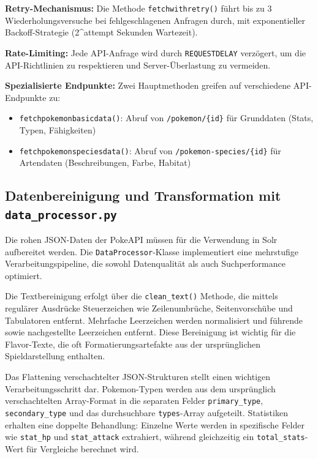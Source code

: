 \textbf{Retry-Mechanismus:} Die Methode \texttt{fetch\textunderscore with\textunderscore retry()} führt bis zu 3 Wiederholungsversuche bei fehlgeschlagenen Anfragen durch, mit exponentieller Backoff-Strategie (2\textasciicircum attempt Sekunden Wartezeit).

\textbf{Rate-Limiting:} Jede API-Anfrage wird durch \texttt{REQUEST\textunderscore DELAY} verzögert, um die API-Richtlinien zu respektieren und Server-Überlastung zu vermeiden.

\textbf{Spezialisierte Endpunkte:} Zwei Hauptmethoden greifen auf verschiedene API-Endpunkte zu:
\begin{itemize}
    \item \texttt{fetch\textunderscore pokemon\textunderscore basic\textunderscore data()}: Abruf von \texttt{/pokemon/\{id\}} für Grunddaten (Stats, Typen, Fähigkeiten)
    \item \texttt{fetch\textunderscore pokemon\textunderscore species\textunderscore data()}: Abruf von \texttt{/pokemon-species/\{id\}} für Artendaten (Beschreibungen, Farbe, Habitat)
\end{itemize}

\subsection{Datenbereinigung und Transformation mit \texttt{data\_processor.py}}

Die rohen JSON-Daten der PokeAPI müssen für die Verwendung in Solr aufbereitet werden. Die \texttt{DataProcessor}-Klasse implementiert eine mehrstufige Verarbeitungspipeline, die sowohl Datenqualität als auch Suchperformance optimiert.

Die Textbereinigung erfolgt über die \texttt{clean\_text()} Methode, die mittels regulärer Ausdrücke Steuerzeichen wie Zeilenumbrüche, Seitenvorschübe und Tabulatoren entfernt. Mehrfache Leerzeichen werden normalisiert und führende sowie nachgestellte Leerzeichen entfernt. Diese Bereinigung ist wichtig für die Flavor-Texte, die oft Formatierungsartefakte aus der ursprünglichen Spieldarstellung enthalten.

Das Flattening verschachtelter JSON-Strukturen stellt einen wichtigen Verarbeitungsschritt dar. Pokemon-Typen werden aus dem ursprünglich verschachtelten Array-Format in die separaten Felder \texttt{primary\_type}, \texttt{secondary\_type} und das durchsuchbare \texttt{types}-Array aufgeteilt. Statistiken erhalten eine doppelte Behandlung: Einzelne Werte werden in spezifische Felder wie \texttt{stat\_hp} und \texttt{stat\_attack} extrahiert, während gleichzeitig ein \texttt{total\_stats}-Wert für Vergleiche berechnet wird.

